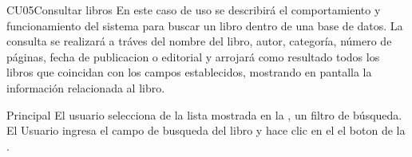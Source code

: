 
	\begin{UseCase}{CU05}{Consultar libros}{
		En este caso de uso se describirá el comportamiento y funcionamiento del sistema para buscar un libro dentro de una base de datos. La consulta se realizará a tráves del nombre del libro, autor, categoría, número de páginas, fecha de publicacion o editorial y arrojará como resultado todos los libros que coincidan con los campos establecidos, mostrando en pantalla la información relacionada al libro.
	}
	\end{UseCase}
	\begin{UCtrayectoria}{Principal}
		\UCpaso[\UCactor] El usuario selecciona de la lista mostrada en la , un filtro de búsqueda.
		\UCpaso[\UCactor] El Usuario ingresa el campo de busqueda del libro y hace clic en el el boton  de la .
	\end{UCtrayectoria}

